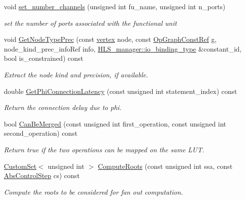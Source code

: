 \begin{DoxyCompactItemize}
void \hyperlink{classAllocationInformation_a7f576f95bbe77b0b548f34ed2550a43c}{set\+\_\+number\+\_\+channels} (unsigned int fu\+\_\+name, unsigned int n\+\_\+ports)
\begin{DoxyCompactList}\small\item\em set the number of ports associated with the functional unit \end{DoxyCompactList}\item 
void \hyperlink{classAllocationInformation_a5abfaf6d87461a2bb2279e10b700f41f}{Get\+Node\+Type\+Prec} (const \hyperlink{graph_8hpp_abefdcf0544e601805af44eca032cca14}{vertex} node, const \hyperlink{op__graph_8hpp_a9a0b240622c47584bee6951a6f5de746}{Op\+Graph\+Const\+Ref} g, node\+\_\+kind\+\_\+prec\+\_\+info\+Ref info, \hyperlink{classHLS__manager_a972627cc658afa992590b9d2bf1a1e87}{H\+L\+S\+\_\+manager\+::io\+\_\+binding\+\_\+type} \&constant\+\_\+id, bool is\+\_\+constrained) const
\begin{DoxyCompactList}\small\item\em Extract the node kind and precision, if available. \end{DoxyCompactList}\item 
double \hyperlink{classAllocationInformation_a2f6e61eeb7824e2da224e7fcc183c523}{Get\+Phi\+Connection\+Latency} (const unsigned int statement\+\_\+index) const
\begin{DoxyCompactList}\small\item\em Return the connection delay due to phi. \end{DoxyCompactList}\item 
bool \hyperlink{classAllocationInformation_ac13ce76541d29e2028a9beaa2df92ec7}{Can\+Be\+Merged} (const unsigned int first\+\_\+operation, const unsigned int second\+\_\+operation) const
\begin{DoxyCompactList}\small\item\em Return true if the two operations can be mapped on the same L\+UT. \end{DoxyCompactList}\item 
\hyperlink{custom__set_8hpp_a615bc2f42fc38a4bb1790d12c759e86f}{Custom\+Set}$<$ unsigned int $>$ \hyperlink{classAllocationInformation_a96304d5aaa11985317824c7a0bc4d5ea}{Compute\+Roots} (const unsigned int ssa, const \hyperlink{structAbsControlStep}{Abs\+Control\+Step} cs) const
\begin{DoxyCompactList}\small\item\em Compute the roots to be considered for fan out computation. \end{DoxyCompactList}\item 

\end{DoxyCompactItemize}
